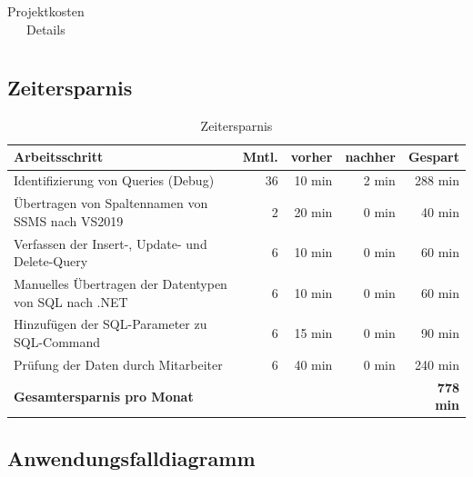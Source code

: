 \documentclass[11pt,toc=sectionentrywithoutdots, 
headheight=44pt, headings=optiontoheadandtoc, hyperfootnotes=false, hypertexnames=false]{scrartcl}
\begin{document}
\begin{center}
\begin{table}[ht]
\begin{tabular}{|| p{27mm} | p{23mm} | r | r | r | r | r ||}
			\end{tabular}
			\caption{Projektkosten Details}
			\end{table}
			\end{center}
			
				
			
	
	
		
		

\subsection{Zeitersparnis}
	\label{sec:Zeitersparnis}
\begin{table}[ht]
\centering
		\begin{tabular}{|| l | r | r | r | r ||}
	    \hline
	    
		\textbf{Arbeitsschritt}                                     & \textbf{Mntl.} &\textbf{vorher} & \textbf{nachher} &\textbf{Gespart}\\
		\hline
		Identifizierung von Queries (Debug)                         & 36        & 10 min         & 2 min	         & 288 min\\
		Übertragen von Spaltennamen von SSMS nach VS2019            & 2         & 20 min         & 0 min	         & 40 min\\
		Verfassen der Insert-, Update- und Delete-Query             & 6         & 10 min         & 0 min	         & 60 min\\
		Manuelles Übertragen der Datentypen von SQL nach .NET       & 6         & 10 min         & 0 min	         & 60 min\\
		Hinzufügen der SQL-Parameter zu SQL-Command                 & 6         & 15 min         & 0 min	         & 90 min\\
		Prüfung der Daten durch Mitarbeiter                         & 6         & 40 min         & 0 min	         & 240 min\\
		\hline		
		\multicolumn{4}{||l|}{\textbf{Gesamtersparnis pro Monat}}                                                &\textbf{778 min}\\
		\hline
		
		
			\end{tabular}
			\caption{Zeitersparnis}
			\end{table}
			


\subsection{Anwendungsfalldiagramm}
\blindtext\blindtext
\end{document}
